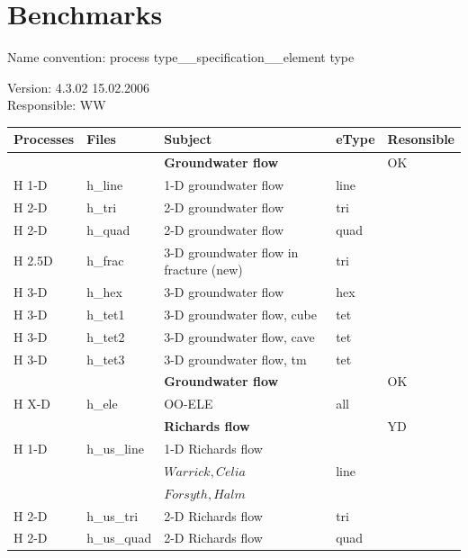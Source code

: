 \section{Benchmarks}

Name convention: process type\_\_specification\_\_element type

Version: 4.3.02  15.02.2006 \\
Responsible: WW

\begin{center}
\begin{tabular*}{12.7cm}{|p{1.5cm}|p{1.8cm}|p{4.78cm}|p{1cm}|p{1.5cm}|} \hline
Processes & Files & Subject                & eType & Resonsible \\
\hline \hline
           &             & \textbf{Groundwater flow} & & OK \\
H 1-D     & h\_line & 1-D groundwater flow   & line & \\
H 2-D     & h\_tri & 2-D groundwater flow & tri &  \\
H 2-D     & h\_quad & 2-D groundwater flow   & quad & \\
H 2.5D     & h\_frac & 3-D groundwater flow in fracture (new)  & tri & \\
H 3-D     & h\_hex & 3-D groundwater flow   & hex & \\
H 3-D     & h\_tet1 & 3-D groundwater flow, cube & tet &  \\
H 3-D     & h\_tet2 & 3-D groundwater flow, cave & tet &  \\
H 3-D     & h\_tet3 & 3-D groundwater flow, tm & tet &  \\
\hline
           &             & \textbf{Groundwater flow} & & OK \\
H X-D     & h\_ele   & OO-ELE & all &  \\
\hline
           &             & \textbf{Richards flow} & & YD \\
H 1-D     & h\_us\_line & 1-D Richards flow  &  & \\
          &   & \(Warrick,Celia\)& line &  \\
          &  & \(Forsyth, Halm \) &  &  \\
H 2-D     & h\_us\_tri   &2-D Richards flow & tri &  \\
H 2-D     & h\_us\_quad  &2-D Richards flow & quad &  \\

\end{tabular*}
\end{center}
